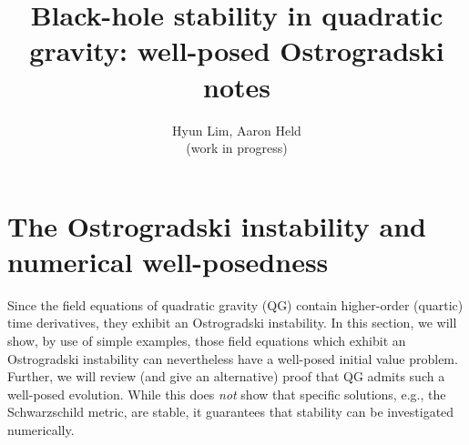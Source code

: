 \documentclass[a4paper,oneside,openany,11pt]{memoir}
\numberwithin{equation}{section} %
\begin{document}
\title{\HUGE Black-hole stability in quadratic gravity: well-posed Ostrogradski notes}

\author{Hyun Lim, Aaron Held\\(work in progress)}


\maketitle

\tableofcontents*


\section{The Ostrogradski instability and numerical well-posedness}

Since the field equations of quadratic gravity (QG) contain higher-order (quartic) time derivatives, they exhibit an Ostrogradski instability. In this section, we will show, by use of simple examples, those field equations which exhibit an Ostrogradski instability can nevertheless have a well-posed initial value problem. Further, we will review (and give an alternative) proof that QG admits such a well-posed evolution. While this does \emph{not} show that specific solutions, e.g., the Schwarzschild metric, are stable, it guarantees that stability can be investigated numerically.
\end{document}
